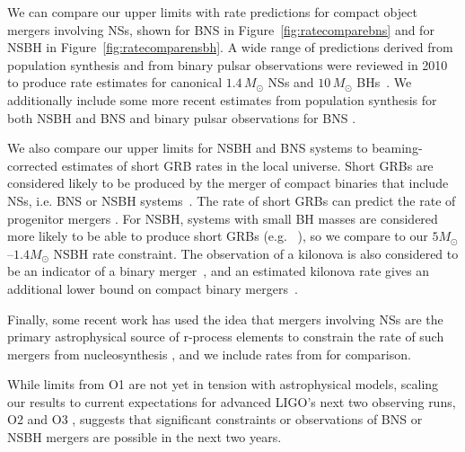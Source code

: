 \documentclass[twocolumn]{aastex6}
\begin{document}
We can compare our upper limits with rate predictions for compact object mergers
involving \acp{NS}, shown for \ac{BNS} in Figure~\ref{fig:ratecomparebns} and for \ac{NSBH} in
Figure~\ref{fig:ratecomparensbh}. A wide range of predictions derived from population
synthesis and from binary pulsar observations were reviewed in 2010 to produce rate estimates
for canonical 
$1.4\,{{M_{\odot}}}$ \acp{NS} and $10\,{{M_{\odot}}}$ \acp{BH}~\citep{Abadie:2010cf}. We
additionally include some more recent estimates from population synthesis for
both \ac{NSBH} and \ac{BNS} \citep{Dominik:2014yma,Belczynski:2015tba,deMink:2015yea} and
binary pulsar observations for \ac{BNS} \citep{Kim:2013tca}. 

We also compare our upper limits for \ac{NSBH} and \ac{BNS} systems to beaming-corrected
estimates of short \ac{GRB} rates in the local universe. Short \acp{GRB} are 
considered likely to be produced by the merger of compact
binaries that include \acp{NS}, i.e. \ac{BNS} or \ac{NSBH}
systems~\citep{Berger:2013jza}. The rate of short \acp{GRB} can 
predict the rate of progenitor mergers %
\citep{Coward:2012gn,Petrillo:2012ij,Siellez:2013hia,Fong:2015oha}.
For \ac{NSBH}, systems with small \ac{BH} masses are considered more likely to be able to
produce short \acp{GRB} (e.g.~ \citep{Duez:2009yz,Giacomazzo:2012zt,Pannarale:2015jia}), so we compare to our
$5 M_{\odot}$--$1.4 M_{\odot}$
\ac{NSBH} rate constraint. The observation of a kilonova is also considered to be an
indicator of a binary merger~\citep{Metzger:2011bv}, and an estimated kilonova rate
gives an additional lower bound on compact binary mergers~\citep{Jin:2015txa}.

Finally, some recent work has used the idea that mergers involving \acp{NS}
are the primary astrophysical source of r-process
elements \citep{1974ApJ...192L.145L,Qian:2007vq} to constrain the rate of such
mergers from nucleosynthesis \citep{Bauswein:2014vfa,Vangioni:2015ofa}, and we
include rates from \citep{Vangioni:2015ofa} for comparison.

While limits from \ac{O1} are not yet in tension with astrophysical models, scaling
our results to current expectations for advanced \ac{LIGO}'s next two observing runs,
O2 and O3 \citep{Aasi:2013wya}, suggests that significant constraints or
observations of \ac{BNS} or \ac{NSBH} mergers are possible in the next two years.
\end{document}

